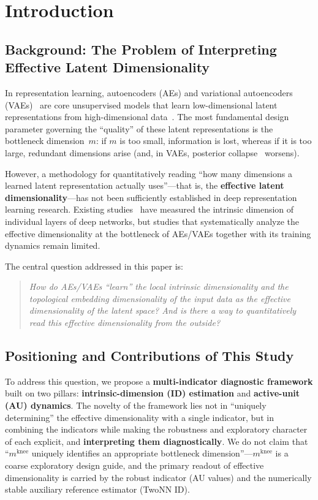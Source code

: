 \documentclass[make,article,submit,pdftex,moreauthors]{Definitions/mdpi}
\newcommand{\mknee}{m^{\mathrm{knee}}}
\begin{document}
\section{Introduction}\label{sec:intro}

\subsection{Background: The Problem of Interpreting Effective Latent Dimensionality}\label{sec:intro_bg}

In representation learning, autoencoders (AEs) and
variational autoencoders (VAEs)~\cite{kingma2014vae} are
core unsupervised models that learn low-dimensional latent representations
from high-dimensional data~\cite{bengio2013representation}.
The most fundamental design parameter governing the ``quality'' of these
latent representations is the bottleneck dimension~$m$:
if $m$ is too small, information is lost, whereas if it is too large,
redundant dimensions arise (and, in VAEs, posterior collapse~\cite{lucas2019elbo} worsens).

However, a methodology for quantitatively reading ``how many dimensions a
learned latent representation actually uses''---that is, the
\textbf{effective latent dimensionality}---has not been sufficiently
established in deep representation learning research.
Existing studies~\cite{ansuini2019intrinsic,valeriani2023geometry} have
measured the intrinsic dimension of individual layers of deep networks,
but studies that systematically analyze the effective dimensionality at the
bottleneck of AEs/VAEs together with its training dynamics remain limited.

The central question addressed in this paper is:
\begin{quote}
\textit{How do AEs/VAEs ``learn'' the local intrinsic dimensionality and the
topological embedding dimensionality of the input data as the effective
dimensionality of the latent space?
And is there a way to quantitatively read this effective dimensionality
from the outside?}
\end{quote}

\subsection{Positioning and Contributions of This Study}\label{sec:intro_aim}

To address this question, we propose a
\textbf{multi-indicator diagnostic framework} built on two pillars:
\textbf{intrinsic-dimension (ID) estimation} and \textbf{active-unit (AU) dynamics}.
The novelty of the framework lies not in ``uniquely determining'' the
effective dimensionality with a single indicator, but in combining the
indicators while making the robustness and exploratory character of each
explicit, and \textbf{interpreting them diagnostically}.
We do not claim that ``$\mknee$ uniquely identifies an appropriate
bottleneck dimension''---$\mknee$ is a coarse exploratory design guide,
and the primary readout of effective dimensionality is carried by the
robust indicator (AU values) and the numerically stable auxiliary
reference estimator (TwoNN ID).
\end{document}
